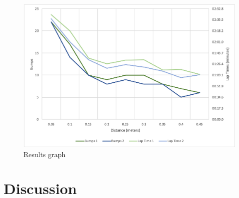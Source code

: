 \documentclass[a4paper,12pt,twocolumn]{article}
\begin{document}
\begin{figure}[h]
\centering
\includegraphics[width=\linewidth]{figures/results_graph.png}
\caption{Results graph}
  \label{fig:graph-results}
\end{figure}

\section{Discussion}

\end{document}
